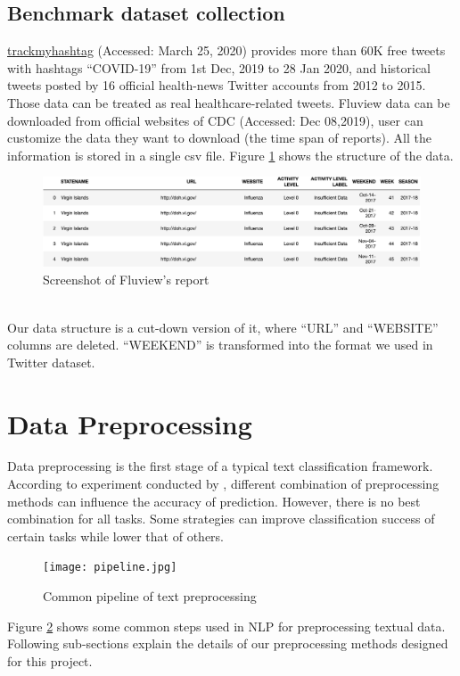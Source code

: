 \subsection{Benchmark dataset collection}
\href{https://www.trackmyhashtag.com/blog/twitter-datasets-free/}{trackmyhashtag} (Accessed: March 25, 2020) provides more than 60K free tweets with hashtags ``COVID-19'' from 1st Dec, 2019 to 28 Jan 2020, and historical tweets posted by 16 official health-news Twitter accounts from 2012 to 2015. Those data can be treated as real healthcare-related tweets. Fluview data can be downloaded from official websites of CDC \cite{cdc:fluView} (Accessed: Dec 08,2019), user can customize the data they want to download (the time span of reports). All the information is stored in a single csv file. Figure \ref{fig:fluView1} shows the structure of the data. 
\begin{figure}[!htbp]
    \center
    \includegraphics[width=5.5in]{images/fluView1.png}
    \caption{Screenshot of Fluview's report}
    \label{fig:fluView1}
\end{figure}
\\
Our data structure is a cut-down version of it, where ``URL'' and ``WEBSITE'' columns are deleted. ``WEEKEND'' is transformed into the format we used in Twitter dataset.

\section{Data Preprocessing}
\label{sec:Preprocessing}
Data preprocessing is the first stage of a typical text classification framework. According to experiment conducted by \cite{uysal2014impact}, different combination of preprocessing methods can influence the accuracy of prediction. However, there is no best combination for all tasks. Some strategies can improve classification success of certain tasks while lower that of others.
\begin{figure}[!htbp]
    \centering
    \texttt{[image: pipeline.jpg]}
    \caption{Common pipeline of text preprocessing}
    \label{fig:pipeline}
\end{figure} 
Figure \ref{fig:pipeline} shows some common steps used in NLP for preprocessing textual data. Following sub-sections explain the details of our preprocessing methods designed for this project.
